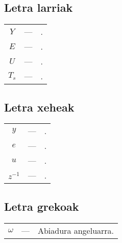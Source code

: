 %

\subsection*{Letra larriak}

\begin{tabular}{c c l}
$Y$ & --- & .\\
$E$ & --- & .\\
$U$ & --- & .\\
$T_s$ & --- & .\\
\end{tabular}

\subsection*{Letra xeheak}
\begin{tabular}{c c l}
$y$ & --- & .\\
$e$ & --- & .\\
$u$ & --- & .\\
$z^{-1}$ & --- & .\\
\end{tabular}

\subsection*{Letra grekoak}
\begin{tabular}{c c l}
$\omega$ & --- & Abiadura angeluarra.\\
\end{tabular}